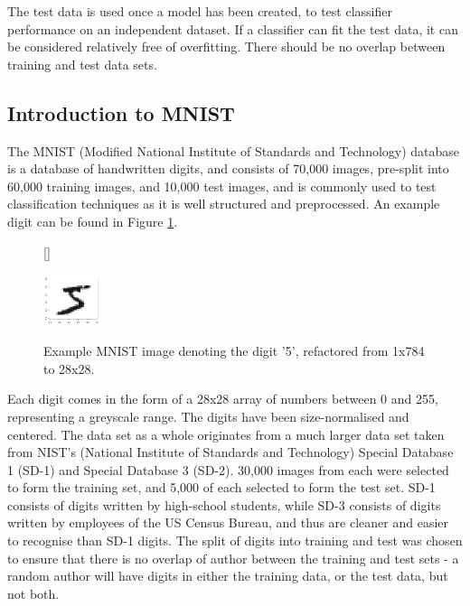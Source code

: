 \documentclass[11pt]{article} %
\begin{document}
The test data is used once a model has been created, to test classifier performance on an independent dataset. If a classifier can fit the test data, it can be considered relatively free of overfitting. There should be no overlap between training and test data sets. 


\subsection{Introduction to MNIST}

The MNIST (Modified National Institute of Standards and Technology) database is a database of handwritten digits, and consists of 70,000 images, pre-split into 60,000 training images, and 10,000 test images, and is commonly used to test classification techniques as it is well structured and preprocessed. An example digit can be found in Figure \ref{fig:mnist_example}.



\begin{figure}[htb!]
[\FBwidth]
{\caption{Example MNIST image denoting the digit '5', refactored from 1x784 to 28x28.}\label{fig:mnist_example}}
{\includegraphics[width=0.15\textwidth]{mnist_example.png}}
\end{figure}

Each digit comes in the form of a 28x28 array of numbers between 0 and 255, representing a greyscale range. The digits have been size-normalised and centered. The data set as a whole originates from a much larger data set taken from NIST's (National Institute of Standards and Technology) Special Database 1 (SD-1) and Special Database 3 (SD-2). 30,000 images from each were selected to form the training set, and 5,000 of each selected to form the test set. SD-1 consists of digits written by high-school students, while SD-3 consists of digits written by employees of the US Census Bureau, and thus are cleaner and easier to recognise than SD-1 digits. The split of digits into training and test was chosen to ensure that there is no overlap of author between the training and test sets - a random author will have digits in either the training data, or the test data, but not both. \cite{mnist-website}
\end{document}
